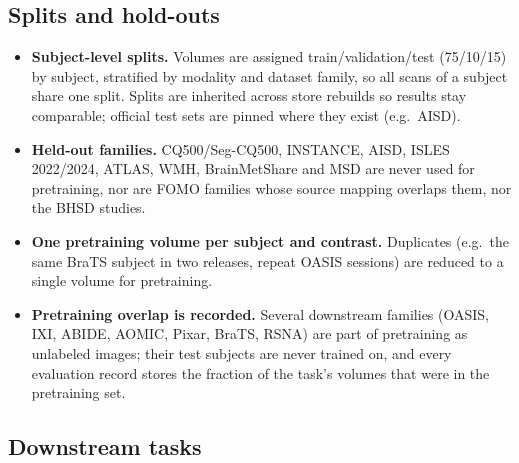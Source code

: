 \documentclass[10pt]{article}
\begin{document}
\subsection{Splits and hold-outs}

\begin{itemize}
  \item \textbf{Subject-level splits.} Volumes are assigned train/validation/test (75/10/15) by subject, stratified
  by modality and dataset family, so all scans of a subject share one split. Splits are inherited across store
  rebuilds so results stay comparable; official test sets are pinned where they exist (e.g.\ AISD).
  \item \textbf{Held-out families.} CQ500/Seg-CQ500, INSTANCE, AISD, ISLES 2022/2024, ATLAS, WMH, BrainMetShare and MSD
  are never used for pretraining, nor are FOMO families whose source mapping overlaps them, nor the BHSD studies.
  \item \textbf{One pretraining volume per subject and contrast.} Duplicates (e.g.\ the same BraTS subject in two
  releases, repeat OASIS sessions) are reduced to a single volume for pretraining.
  \item \textbf{Pretraining overlap is recorded.} Several downstream families (OASIS, IXI, ABIDE, AOMIC, Pixar,
  BraTS, RSNA) are part of pretraining as unlabeled images; their test subjects are never trained on, and every
  evaluation record stores the fraction of the task's volumes that were in the pretraining set.
\end{itemize}

\subsection{Downstream tasks}
\end{document}
